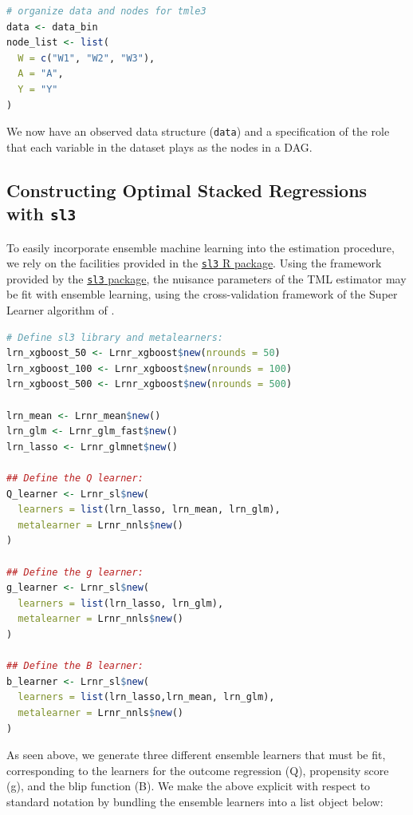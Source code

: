 \documentclass[
  12pt, krantz2,
]{krantz}
\newcommand{\passthrough}[1]{#1}
\newcommand{\1}{\mathbbm{1}}
\theoremstyle{definition}
\theoremstyle{definition}
\theoremstyle{definition}
\theoremstyle{definition}
\theoremstyle{remark}
\begin{document}
\begin{lstlisting}[language=R]
# organize data and nodes for tmle3
data <- data_bin
node_list <- list(
  W = c("W1", "W2", "W3"),
  A = "A",
  Y = "Y"
)
\end{lstlisting}

We now have an observed data structure (\passthrough{\lstinline!data!}) and a specification of the role
that each variable in the dataset plays as the nodes in a DAG.

\hypertarget{constructing-optimal-stacked-regressions-with-sl3}{%
\subsection{\texorpdfstring{Constructing Optimal Stacked Regressions with \texttt{sl3}}{Constructing Optimal Stacked Regressions with sl3}}\label{constructing-optimal-stacked-regressions-with-sl3}}

To easily incorporate ensemble machine learning into the estimation procedure,
we rely on the facilities provided in the \href{https://tlverse.org/sl3}{\passthrough{\lstinline!sl3!} R
package}. Using the framework provided by the \href{https://tlverse.org/sl3}{\passthrough{\lstinline!sl3!}
package}, the nuisance parameters of the TML estimator
may be fit with ensemble learning, using the cross-validation framework of the
Super Learner algorithm of \citet{vdl2007super}.

\begin{lstlisting}[language=R]
# Define sl3 library and metalearners:
lrn_xgboost_50 <- Lrnr_xgboost$new(nrounds = 50)
lrn_xgboost_100 <- Lrnr_xgboost$new(nrounds = 100)
lrn_xgboost_500 <- Lrnr_xgboost$new(nrounds = 500)

lrn_mean <- Lrnr_mean$new()
lrn_glm <- Lrnr_glm_fast$new()
lrn_lasso <- Lrnr_glmnet$new()

## Define the Q learner:
Q_learner <- Lrnr_sl$new(
  learners = list(lrn_lasso, lrn_mean, lrn_glm),
  metalearner = Lrnr_nnls$new()
)

## Define the g learner:
g_learner <- Lrnr_sl$new(
  learners = list(lrn_lasso, lrn_glm),
  metalearner = Lrnr_nnls$new()
)

## Define the B learner:
b_learner <- Lrnr_sl$new(
  learners = list(lrn_lasso,lrn_mean, lrn_glm),
  metalearner = Lrnr_nnls$new()
)
\end{lstlisting}

As seen above, we generate three different ensemble learners that must be fit,
corresponding to the learners for the outcome regression (Q), propensity score
(g), and the blip function (B). We make the above explicit with respect to
standard notation by bundling the ensemble learners into a list object below:
\end{document}
